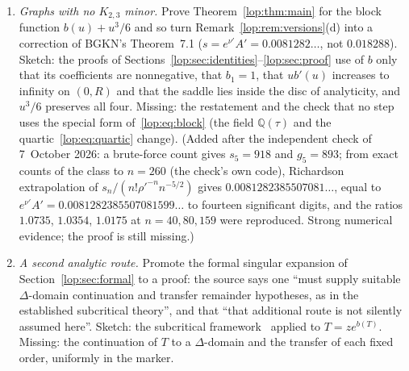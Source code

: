 \documentclass[11pt,letterpaper]{article}
\numberwithin{equation}{section}
\theoremstyle{remark}\newtheorem{remark}[theorem]{Remark}
\newcommand{\QQ}{\mathbb Q}
\begin{document}
\begin{enumerate}[start=5]
{times these, that is $3\sqrt\pi=5.31736\ldots$ to their printed precision
($3\sqrt\pi=\tfrac94\Gamma(-\tfrac32)$). So the series--parallel constants
appear to be affected too, by a different factor. Still missing: a proof
(Theorem~\ref{lop:thm:main} is stated for $b$ only) and an account of
BGKN's computation.)}
\item\label{lop:q:k23} \emph{Graphs with no $K_{2,3}$ minor.} Prove
Theorem~\ref{lop:thm:main} for the block function $b(u)+u^3/6$ and so turn
Remark~\ref{lop:rem:versions}(d) into a correction of BGKN's Theorem~7.1
($s=e^{\nu'}A'=0.0081282\ldots$, not $0.018288$). Sketch: the proofs of
Sections~\ref{lop:sec:identities}--\ref{lop:sec:proof} use of $b$ only that
its coefficients are nonnegative, that $b_1=1$, that $ub'(u)$ increases to
infinity on $(0,R)$ and that the saddle lies inside the disc of
analyticity, and $u^3/6$ preserves all four. Missing: the restatement and
the check that no step uses the special form of~\eqref{lop:eq:block} (the
field $\QQ(\tau)$ and the quartic~\eqref{lop:eq:quartic} change).
\textup{(Added after the independent check of 7~October 2026: a brute-force
count gives $s_5=918$ and $g_5=893$; from exact counts of the class to
$n=260$ (the check's own code), Richardson extrapolation of
$s_n/(n!\rho'^{-n}n^{-5/2})$ gives $0.0081282385507081\ldots$, equal to
$e^{\nu'}A'=0.0081282385507081599\ldots$ to fourteen significant digits, and the ratios
$1.0735$, $1.0354$, $1.0175$ at $n=40,80,159$ were reproduced. Strong
numerical evidence; the proof is still missing.)}
\item\label{lop:q:singular} \emph{A second analytic route.} Promote the
formal singular expansion of Section~\ref{lop:sec:formal} to a proof: the
source says one ``must supply suitable $\Delta$-domain continuation and
transfer remainder hypotheses, as in the established subcritical theory'',
and that ``that additional route is not silently assumed here''. Sketch:
the subcritical framework~\cite{subcritical} applied to $T=ze^{b(T)}$.
Missing: the continuation of $T$ to a $\Delta$-domain and the transfer of
each fixed order, uniformly in the marker.
\end{enumerate}
\end{document}
